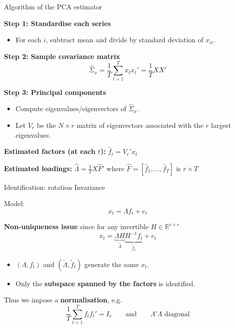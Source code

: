 \documentclass{beamer}
\begin{document}
\begin{frame}[label=pca-algorithm]{Algorithm of the PCA estimator}
\small

\textbf{Step 1: Standardise each series}
\begin{itemize}
  \item For each $i$, subtract mean and divide by standard deviation of $x_{it}$.
\end{itemize}

\medskip
\textbf{Step 2: Sample covariance matrix}
\[
\hat{\Sigma}_x = \frac{1}{T} \sum_{t=1}^T x_t x_t' = \frac{1}{T} X X'
\]

\medskip
\textbf{Step 3: Principal components}
\begin{itemize}
  \item Compute eigenvalues/eigenvectors of $\hat{\Sigma}_x$.
  \item Let $V_r$ be the $N \times r$ matrix of eigenvectors associated with the
        $r$ largest eigenvalues.
\end{itemize}

\textbf{Estimated factors (at each $t$):} $\hat{f}_t = V_r' x_t$

\textbf{Estimated loadings:} $\hat{\Lambda} = \frac{1}{T} X \hat{F}'$ where $\hat{F} = [\hat{f}_1, \dots, \hat{f}_T]$ is $r \times T$

\end{frame}



\begin{frame}{Identification: rotation Invariance}
\small

Model:
\[
x_t = \Lambda f_t + e_t
\]

\textbf{Non-uniqueness issue} since for any invertible $H \in \mathbb{R}^{r \times r}$
\[
x_t = \underbrace{\Lambda H}_{\tilde{\Lambda}} \underbrace{H^{-1} f_t}_{\tilde{f}_t} + e_t
\]

\begin{itemize}
  \item $(\Lambda, f_t)$ and $(\tilde{\Lambda}, \tilde{f}_t)$ generate the same $x_t$.
  \item Only the \textbf{subspace spanned by the factors} is identified.
\end{itemize}

Thus we impose a \textbf{normalisation}, e.g.
\[
\frac{1}{T} \sum_{t=1}^T f_t f_t' = I_r
\qquad\text{and}\qquad
\Lambda'\Lambda \text{ diagonal}
\]


\end{frame}
\end{document}
